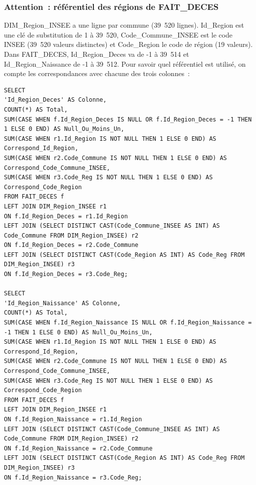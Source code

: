 \subsubsection{Attention~: référentiel des régions de FAIT\_DECES}

\noindent DIM\_Region\_INSEE a une ligne par commune (39~520 lignes). Id\_Region est une clé de substitution de 1 à 39~520, Code\_Commune\_INSEE est le code INSEE (39~520 valeurs distinctes) et Code\_Region le code de région (19 valeurs). Dans FAIT\_DECES, Id\_Region\_Deces va de -1 à 39~514 et Id\_Region\_Naissance de -1 à 39~512. Pour savoir quel référentiel est utilisé, on compte les correspondances avec chacune des trois colonnes~:

\begin{verbatim}
SELECT
'Id_Region_Deces' AS Colonne,
COUNT(*) AS Total,
SUM(CASE WHEN f.Id_Region_Deces IS NULL OR f.Id_Region_Deces = -1 THEN 1 ELSE 0 END) AS Null_Ou_Moins_Un,
SUM(CASE WHEN r1.Id_Region IS NOT NULL THEN 1 ELSE 0 END) AS Correspond_Id_Region,
SUM(CASE WHEN r2.Code_Commune IS NOT NULL THEN 1 ELSE 0 END) AS Correspond_Code_Commune_INSEE,
SUM(CASE WHEN r3.Code_Reg IS NOT NULL THEN 1 ELSE 0 END) AS Correspond_Code_Region
FROM FAIT_DECES f
LEFT JOIN DIM_Region_INSEE r1
ON f.Id_Region_Deces = r1.Id_Region
LEFT JOIN (SELECT DISTINCT CAST(Code_Commune_INSEE AS INT) AS Code_Commune FROM DIM_Region_INSEE) r2
ON f.Id_Region_Deces = r2.Code_Commune
LEFT JOIN (SELECT DISTINCT CAST(Code_Region AS INT) AS Code_Reg FROM DIM_Region_INSEE) r3
ON f.Id_Region_Deces = r3.Code_Reg;

SELECT
'Id_Region_Naissance' AS Colonne,
COUNT(*) AS Total,
SUM(CASE WHEN f.Id_Region_Naissance IS NULL OR f.Id_Region_Naissance = -1 THEN 1 ELSE 0 END) AS Null_Ou_Moins_Un,
SUM(CASE WHEN r1.Id_Region IS NOT NULL THEN 1 ELSE 0 END) AS Correspond_Id_Region,
SUM(CASE WHEN r2.Code_Commune IS NOT NULL THEN 1 ELSE 0 END) AS Correspond_Code_Commune_INSEE,
SUM(CASE WHEN r3.Code_Reg IS NOT NULL THEN 1 ELSE 0 END) AS Correspond_Code_Region
FROM FAIT_DECES f
LEFT JOIN DIM_Region_INSEE r1
ON f.Id_Region_Naissance = r1.Id_Region
LEFT JOIN (SELECT DISTINCT CAST(Code_Commune_INSEE AS INT) AS Code_Commune FROM DIM_Region_INSEE) r2
ON f.Id_Region_Naissance = r2.Code_Commune
LEFT JOIN (SELECT DISTINCT CAST(Code_Region AS INT) AS Code_Reg FROM DIM_Region_INSEE) r3
ON f.Id_Region_Naissance = r3.Code_Reg;
\end{verbatim}
